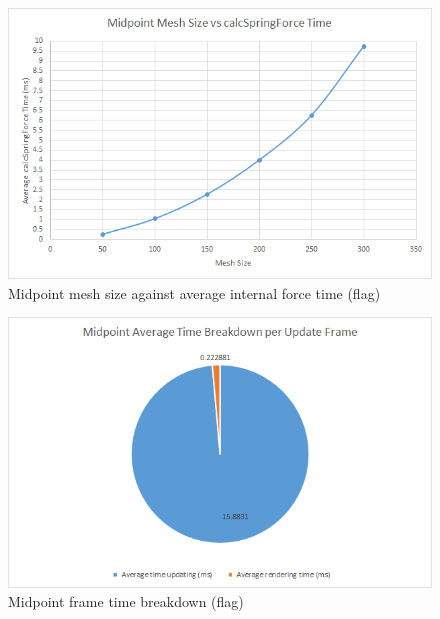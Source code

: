     \begin{figure}
    \begin{center}
      \includegraphics[scale=.9]{Figures/flag_m_m_csf}
    \end{center}
    \caption{Midpoint mesh size against average internal force time (flag)}
    \label{fig:m mesh csf flag}
  \end{figure}
  
    \begin{figure}
    \begin{center}
      \includegraphics[scale=.9]{Figures/flag_m_ft}
    \end{center}
    \caption{Midpoint frame time breakdown (flag)}
    \label{fig:m ft flag}
  \end{figure}
  
